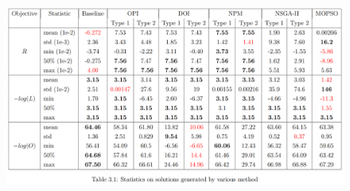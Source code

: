 
\begin{figure}[H] \label{fig:results-table}
\centering
\includegraphics[width=1.0\textwidth]{images/results-table.png}
\end{figure}


